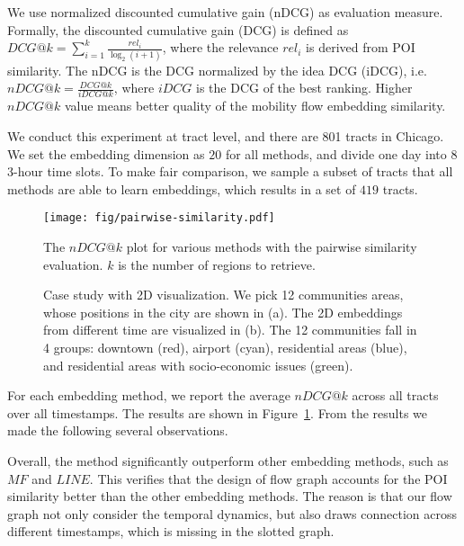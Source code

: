 We use normalized discounted cumulative gain (nDCG) as evaluation measure. Formally, the discounted cumulative gain (DCG) is defined as $DCG@k = \sum_{i=1}^k\frac{rel_i}{\log_2 (i+1)}$, where the relevance $rel_i$ is derived from POI similarity. The nDCG is the DCG normalized by the idea DCG (iDCG), i.e. $nDCG@k = \frac{DCG@k}{iDCG@k}$, 
where $iDCG$ is the DCG of the best ranking. Higher $nDCG@k$ value means better quality of the mobility flow embedding similarity.


We conduct this experiment at tract level, and there are 801 tracts in Chicago. We set the embedding dimension as $20$ for all methods, and divide one day into $8$ 3-hour time slots. To make fair comparison, we sample a subset of tracts that all methods are able to learn embeddings, which results in a set of $419$ tracts.

\begin{figure}[h]
\centering
\texttt{[image: fig/pairwise-similarity.pdf]}
\vspace{-3mm}
\caption{The $nDCG@k$ plot for various methods with the pairwise similarity evaluation. $k$ is the number of regions to retrieve.}
\label{fig:pairwise-eval}
\end{figure}

\begin{figure*}[t]
\centering
{}
\vspace{-3mm}
\caption{Case study with 2D visualization. We pick 12 communities areas, whose positions in the city  are shown in (a). The 2D embeddings from different time are visualized in (b). The 12 communities fall in 4 groups: downtown (red), airport (cyan), residential areas (blue), and residential areas with socio-economic issues (green).}
\label{fig:case-study}
\end{figure*}


For each embedding method, we report the average $nDCG@k$ across all tracts over all timestamps. The results are shown in Figure~\ref{fig:pairwise-eval}. From the results we made the following several observations.

Overall, the \hdge method significantly outperform other embedding methods, such as $MF$ and $LINE$. This verifies that the design of flow graph accounts for the POI similarity better than the other embedding methods. The reason is that our flow graph not only consider the temporal dynamics, but also draws connection across different timestamps, which is missing in the slotted graph.




